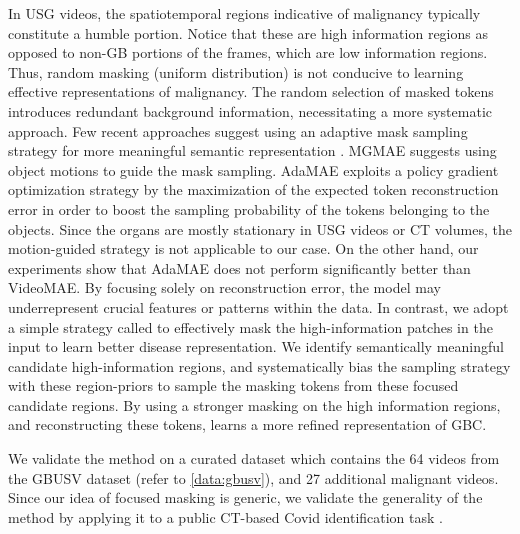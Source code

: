 %
In USG videos, the spatiotemporal regions indicative of malignancy typically constitute a humble portion. Notice that these are high information regions as opposed to non-GB portions of the frames, which are low information regions. 
Thus, random masking (uniform distribution) is not conducive to learning effective representations of malignancy. The random selection of masked tokens introduces redundant background information, necessitating a more systematic approach. Few recent approaches suggest using an adaptive mask sampling strategy for more meaningful semantic representation \cite{adamae, mgmae}. MGMAE \cite{mgmae} suggests using object motions to guide the mask sampling. AdaMAE \cite{adamae} exploits a policy gradient optimization strategy by the maximization of the expected token reconstruction error in order to boost the sampling probability of the tokens belonging to the objects. Since the organs are mostly stationary in USG videos or CT volumes, the motion-guided strategy is not applicable to our case. On the other hand, our experiments show that AdaMAE does not perform significantly better than VideoMAE. By focusing solely on reconstruction error, the model may underrepresent crucial features or patterns within the data. In contrast, we adopt a simple strategy called \focusmae to effectively mask the high-information patches in the input to learn better disease representation. We identify semantically meaningful candidate high-information regions, and systematically bias the sampling strategy with these region-priors to sample the masking tokens from these focused candidate regions. By using a stronger masking on the high information regions, and reconstructing these tokens, \focusmae learns a more refined representation of GBC. %

\par We validate the \focusmae method on a curated dataset which contains the 64 videos from the GBUSV dataset (refer to \cref{data:gbusv}), and 27 additional malignant videos. Since our idea of focused masking is generic, we validate the generality of the method by applying it to a public CT-based Covid identification task \cite{covidctmd}.

